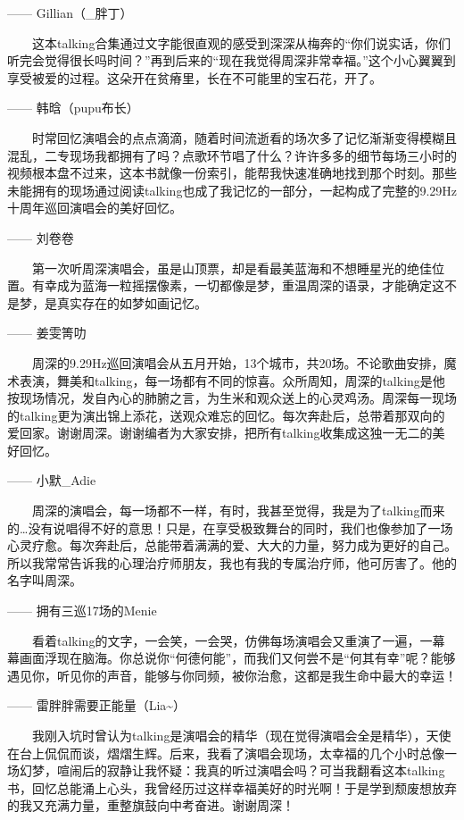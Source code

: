 \documentclass[]{ctexbook}
\begin{document}
------ Gillian（\_胖丁）

  这本talking合集通过文字能很直观的感受到深深从梅奔的``你们说实话，你们听完会觉得很长吗时间？''再到后来的``现在我觉得周深非常幸福。''这个小心翼翼到享受被爱的过程。这朵开在贫瘠里，长在不可能里的宝石花，开了。

------ 韩晗（pupu布长）

  时常回忆演唱会的点点滴滴，随着时间流逝看的场次多了记忆渐渐变得模糊且混乱，二专现场我都拥有了吗？点歌环节唱了什么？许许多多的细节每场三小时的视频根本盘不过来，这本书就像一份索引，能帮我快速准确地找到那个时刻。那些未能拥有的现场通过阅读talking也成了我记忆的一部分，一起构成了完整的9.29Hz十周年巡回演唱会的美好回忆。

------ 刘卷卷

  第一次听周深演唱会，虽是山顶票，却是看最美蓝海和不想睡星光的绝佳位置。有幸成为蓝海一粒摇摆像素，一切都像是梦，重温周深的语录，才能确定这不是梦，是真实存在的如梦如画记忆。

------ 姜雯箐叻

  周深的9.29Hz巡回演唱会从五月开始，13个城市，共20场。不论歌曲安排，魔术表演，舞美和talking，每一场都有不同的惊喜。众所周知，周深的talking是他按现场情况，发自內心的肺腑之言，为生米和观众送上的心灵鸡汤。周深每一现场的talking更为演出锦上添花，送观众难忘的回忆。每次奔赴后，总带着那双向的爱回家。谢谢周深。谢谢编者为大家安排，把所有talking收集成这独一无二的美好回忆。

------ 小默\_Adie

  周深的演唱会，每一场都不一样，有时，我甚至觉得，我是为了talking而来的\ldots 没有说唱得不好的意思！只是，在享受极致舞台的同时，我们也像参加了一场心灵疗愈。每次奔赴后，总能带着满满的爱、大大的力量，努力成为更好的自己。所以我常常告诉我的心理治疗师朋友，我也有我的专属治疗师，他可厉害了。他的名字叫周深。

------ 拥有三巡17场的Menie

  看着talking的文字，一会笑，一会哭，仿佛每场演唱会又重演了一遍，一幕幕画面浮现在脑海。你总说你``何德何能''，而我们又何尝不是``何其有幸''呢？能够遇见你，听见你的声音，能够与你同频，被你治愈，这都是我生命中最大的幸运！

------ 雷胖胖需要正能量（Lia\textasciitilde）

  我刚入坑时曾认为talking是演唱会的精华（现在觉得演唱会全是精华），天使在台上侃侃而谈，熠熠生辉。后来，我看了演唱会现场，太幸福的几个小时总像一场幻梦，喧闹后的寂静让我怀疑：我真的听过演唱会吗？可当我翻看这本talking书，回忆总能涌上心头，我曾经历过这样幸福美好的时光啊！于是学到颓废想放弃的我又充满力量，重整旗鼓向中考奋进。谢谢周深！
\end{document}
